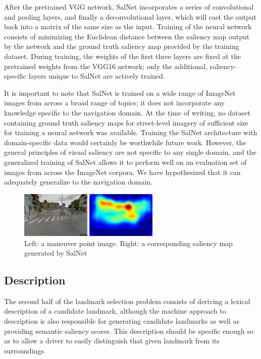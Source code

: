 After the pretrained VGG network, SalNet incorporates a series of convolutional and pooling layers, and finally a deconvolutional layer, which will cast the output back into a matrix of the same size as the input. Training of the neural network consists of minimizing the Euclidean distance between the saliency map output by the network and the ground truth saliency map provided by the training dataset. During training, the weights of the first three layers are fixed at the pretrained weights from the VGG16 network; only the additional, saliency-specific layers unique to SalNet are actively trained.

It is important to note that SalNet is trained on a wide range of ImageNet images from across a broad range of topics; it does not incorporate any knowledge specific to the navigation domain. At the time of writing, no dataset containing ground truth saliency maps for street-level imagery of sufficient size for training a neural network was available. Training the SalNet architecture with domain-specific data would certainly be worthwhile future work. However, the general principles of visual saliency are not specific to any single domain, and the generalized training of SalNet allows it to perform well on an evaluation set of images from across the ImageNet corpora. We have hypothesized that it can adequately generalize to the navigation domain.

\begin{figure}[htbp]
  \centering
  \includegraphics[width=0.6\textwidth]{images/saliencyMap.png}
  \caption{Left: a maneuver point image. Right: a corresponding saliency map generated by SalNet}
  \label{fig:saliencyMap}
\end{figure}

\subsection{Description}
The second half of the landmark selection problem consists of deriving a lexical description of a candidate landmark, although the machine approach to description is also responsible for generating candidate landmarks as well as providing semantic saliency scores. This description should be specific enough so as to allow a driver to easily distinguish that given landmark from its surroundings.

